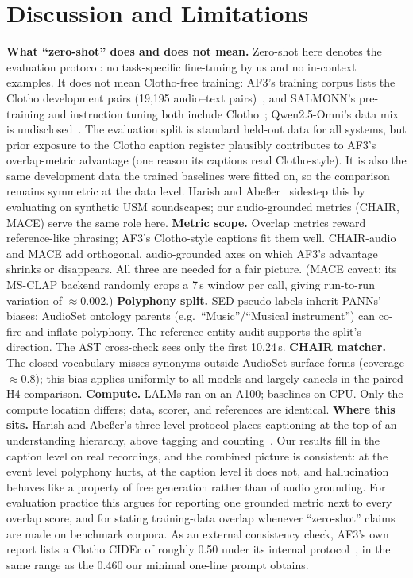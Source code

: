 \documentclass[conference]{IEEEtran}
\begin{document}
\section{Discussion and Limitations}\label{sec:discussion}
\textbf{What ``zero-shot'' does and does not mean.} Zero-shot here denotes the
evaluation protocol: no task-specific fine-tuning by us and no in-context
examples. It does not mean Clotho-free training: AF3's training corpus lists
the Clotho development pairs (19{,}195 audio--text pairs)~\cite{goel2025af3},
and SALMONN's pre-training and instruction tuning both include
Clotho~\cite{tang2024salmonn}; Qwen2.5-Omni's data mix is
undisclosed~\cite{xu2025qwenomni}. The evaluation split is standard held-out
data for all systems, but prior exposure to the Clotho caption register
plausibly contributes to AF3's overlap-metric advantage (one reason its
captions read Clotho-style). It is also the same development data the trained
baselines were fitted on, so the comparison remains symmetric at the data
level. Harish and Abe{\ss}er~\cite{harish2025dcase} sidestep this by
evaluating on synthetic USM soundscapes; our audio-grounded metrics (CHAIR,
MACE) serve the same role here.
\textbf{Metric scope.} Overlap metrics reward reference-like phrasing; AF3's
Clotho-style captions fit them well. CHAIR-audio and MACE add orthogonal,
audio-grounded axes on which AF3's advantage shrinks or disappears. All three
are needed for a fair picture. (MACE caveat: its MS-CLAP backend randomly
crops a 7\,s window per call, giving run-to-run variation of $\approx$0.002.)
\textbf{Polyphony split.} SED pseudo-labels inherit PANNs' biases; AudioSet
ontology parents (e.g.\ ``Music''/``Musical instrument'') can co-fire and
inflate polyphony. The reference-entity audit supports the split's direction.
The AST cross-check sees only the first 10.24\,s.
\textbf{CHAIR matcher.} The closed vocabulary misses synonyms outside AudioSet
surface forms (coverage $\approx$0.8); this bias applies uniformly to all
models and largely cancels in the paired H4 comparison.
\textbf{Compute.} LALMs ran on an A100; baselines on CPU. Only the compute
location differs; data, scorer, and references are identical.
\textbf{Where this sits.} Harish and Abe{\ss}er's three-level protocol places
captioning at the top of an understanding hierarchy, above tagging and
counting~\cite{harish2025dcase}. Our results fill in the caption level on real
recordings, and the combined picture is consistent: at the event level
polyphony hurts, at the caption level it does not, and hallucination behaves
like a property of free generation rather than of audio grounding. For
evaluation practice this argues for reporting one grounded metric next to
every overlap score, and for stating training-data overlap whenever
``zero-shot'' claims are made on benchmark corpora. As an external
consistency check, AF3's own report lists a Clotho CIDEr of roughly
0.50 under its internal protocol~\cite{goel2025af3}, in the same range as the
0.460 our minimal one-line prompt obtains.
\end{document}
